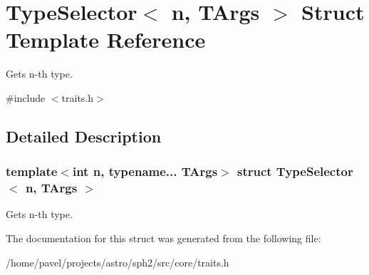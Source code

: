 \hypertarget{structTypeSelector}{}\section{Type\+Selector$<$ n, T\+Args $>$ Struct Template Reference}
\label{structTypeSelector}


Gets n-\/th type.  




{\ttfamily \#include $<$traits.\+h$>$}



\subsection{Detailed Description}
\subsubsection*{template$<$int n, typename... T\+Args$>$\newline
struct Type\+Selector$<$ n, T\+Args $>$}

Gets n-\/th type. 

The documentation for this struct was generated from the following file\+:\begin{DoxyCompactItemize}
\item 
/home/pavel/projects/astro/sph2/src/core/traits.\+h\end{DoxyCompactItemize}
